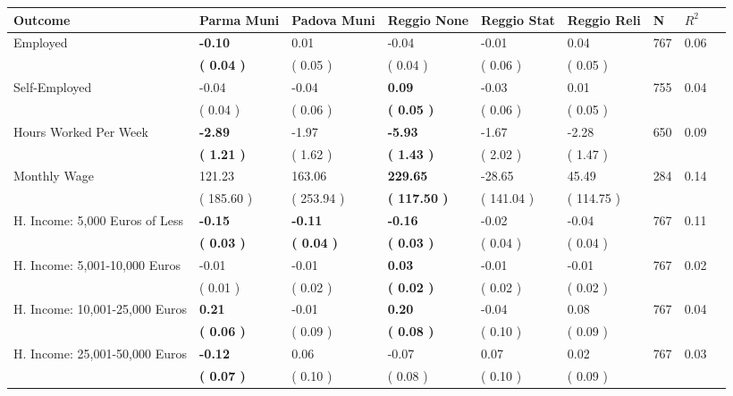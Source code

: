 \begin{tabular}{L{6.2cm} C{1.8cm} C{1.8cm} C{1.8cm} C{1.8cm} C{1.8cm} C{1.8cm} C{0.3cm} C{0.3cm}}
\toprule
 \textbf{Outcome} & \textbf{Parma Muni} & \textbf{Padova Muni} & \textbf{Reggio None} & \textbf{Reggio Stat} & \textbf{Reggio Reli} & \textbf{N} & \textbf{$ R^2$} \\
\midrule
Employed & \textbf{    -0.10} &      0.01 &     -0.04 &     -0.01 &      0.04  & 767 &       0.06 \\ 
 & \textbf{(     0.04 )} & (     0.05 ) & (     0.04 ) & (     0.06 ) & (     0.05 )  & \\
Self-Employed &     -0.04 &     -0.04 & \textbf{     0.09} &     -0.03 &      0.01  & 755 &       0.04 \\ 
 & (     0.04 ) & (     0.06 ) & \textbf{(     0.05 )} & (     0.06 ) & (     0.05 )  & \\
Hours Worked Per Week & \textbf{    -2.89} &     -1.97 & \textbf{    -5.93} &     -1.67 &     -2.28  & 650 &       0.09 \\ 
 & \textbf{(     1.21 )} & (     1.62 ) & \textbf{(     1.43 )} & (     2.02 ) & (     1.47 )  & \\
Monthly Wage &    121.23 &    163.06 & \textbf{   229.65} &    -28.65 &     45.49  & 284 &       0.14 \\ 
 & (   185.60 ) & (   253.94 ) & \textbf{(   117.50 )} & (   141.04 ) & (   114.75 )  & \\
H. Income: 5,000 Euros of Less & \textbf{    -0.15} & \textbf{    -0.11} & \textbf{    -0.16} &     -0.02 &     -0.04  & 767 &       0.11 \\ 
 & \textbf{(     0.03 )} & \textbf{(     0.04 )} & \textbf{(     0.03 )} & (     0.04 ) & (     0.04 )  & \\
H. Income: 5,001-10,000 Euros &     -0.01 &     -0.01 & \textbf{     0.03} &     -0.01 &     -0.01  & 767 &       0.02 \\ 
 & (     0.01 ) & (     0.02 ) & \textbf{(     0.02 )} & (     0.02 ) & (     0.02 )  & \\
H. Income: 10,001-25,000 Euros & \textbf{     0.21} &     -0.01 & \textbf{     0.20} &     -0.04 &      0.08  & 767 &       0.04 \\ 
 & \textbf{(     0.06 )} & (     0.09 ) & \textbf{(     0.08 )} & (     0.10 ) & (     0.09 )  & \\
H. Income: 25,001-50,000 Euros & \textbf{    -0.12} &      0.06 &     -0.07 &      0.07 &      0.02  & 767 &       0.03 \\ 
 & \textbf{(     0.07 )} & (     0.10 ) & (     0.08 ) & (     0.10 ) & (     0.09 )  & \\

\end{tabular}
